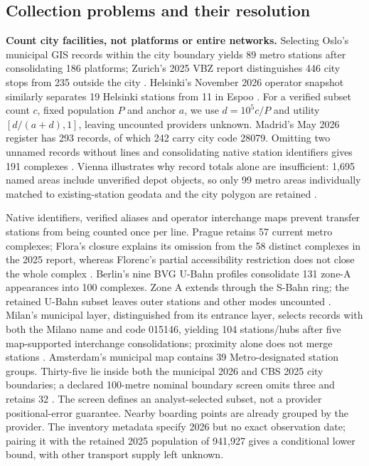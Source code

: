 \subsection{Collection problems and their resolution}
\textbf{Count city facilities, not platforms or entire networks.}
Selecting Oslo's municipal GIS records within the city boundary yields 89
metro stations after consolidating 186
platforms; Zurich's 2025 VBZ report distinguishes 446 city stops from 235
outside the city \cite{oslo,vbz}. Helsinki's November 2026 operator snapshot
similarly separates 19 Helsinki stations from 11 in Espoo \cite{helsinki}.
For a verified subset count $c$, fixed population $P$ and anchor $a$, we use
$d=10^5c/P$ and utility $[d/(a+d),1]$, leaving uncounted providers unknown.
Madrid's May 2026 register has 293 records, of which 242 carry city code
28079. Omitting two unnamed records without lines and consolidating native
station identifiers gives 191 complexes \cite{madridmetro,inecodes}. Vienna illustrates why record totals
alone are insufficient: 1,695 named areas include unverified depot objects,
so only 99 metro areas individually matched to existing-station geodata and
the city polygon are retained \cite{viennaogd,viennagis}.

Native identifiers, verified aliases and operator interchange maps prevent
transfer stations from being counted once per line. Prague retains 57 current
metro complexes; Flora's closure explains its omission from the 58 distinct
complexes in the 2025 report, whereas Florenc's partial accessibility restriction
does not close the whole complex \cite{pidmetro,dpp2025,floraclose}.
Berlin's nine BVG U-Bahn profiles consolidate 131 zone-A appearances into 100
complexes. Zone A extends through the S-Bahn ring; the retained U-Bahn subset
leaves outer stations and other modes uncounted
\cite{bvg}. Milan's municipal layer, distinguished from its entrance layer,
selects records with both the Milano name and code 015146, yielding 104
stations/hubs after five map-supported interchange consolidations;
proximity alone does not merge stations \cite{milanmetro}.
Amsterdam's municipal map contains 39 Metro-designated station groups.
Thirty-five lie inside both the municipal 2026 and CBS 2025 city boundaries;
a declared 100-metre nominal boundary screen omits three and retains 32
\cite{amsterdammetro2026,cbsboundary2025}. The screen defines an analyst-selected
subset, not a provider positional-error guarantee. Nearby boarding points are
already grouped by the provider. The inventory metadata specify 2026 but no
exact observation date; pairing it with the retained 2025 population of 941,927
gives a conditional lower bound, with other transport supply left unknown.

